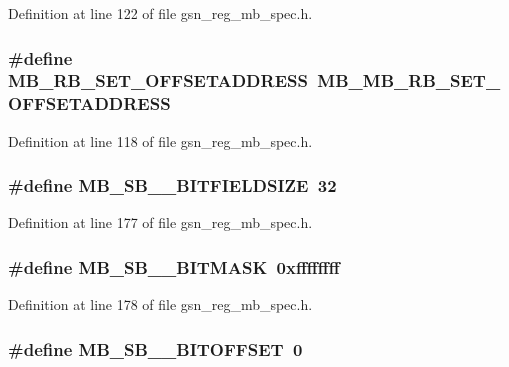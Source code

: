 Definition at line 122 of file gsn\_\-reg\_\-mb\_\-spec.h.

\hypertarget{a00562_abe72a2bd73f8a64e98523a119f226856}{
\subsubsection[{MB\_\-RB\_\-SET\_\-OFFSETADDRESS}]{\setlength{\rightskip}{0pt plus 5cm}\#define MB\_\-RB\_\-SET\_\-OFFSETADDRESS~MB\_\-MB\_\-RB\_\-SET\_\-OFFSETADDRESS}}
\label{a00562_abe72a2bd73f8a64e98523a119f226856}


Definition at line 118 of file gsn\_\-reg\_\-mb\_\-spec.h.

\hypertarget{a00562_aaec7d6f877389ed3b70fb6ee5a07a5e5}{
\subsubsection[{MB\_\-SB\_\-0\_\-BITFIELDSIZE}]{\setlength{\rightskip}{0pt plus 5cm}\#define MB\_\-SB\_\_\-BITFIELDSIZE~32}}
\label{a00562_aaec7d6f877389ed3b70fb6ee5a07a5e5}


Definition at line 177 of file gsn\_\-reg\_\-mb\_\-spec.h.

\hypertarget{a00562_a5dc722f16108621d17c15ad979f571aa}{
\subsubsection[{MB\_\-SB\_\-0\_\-BITMASK}]{\setlength{\rightskip}{0pt plus 5cm}\#define MB\_\-SB\_\_\-BITMASK~0xffffffff}}
\label{a00562_a5dc722f16108621d17c15ad979f571aa}


Definition at line 178 of file gsn\_\-reg\_\-mb\_\-spec.h.

\hypertarget{a00562_ac22daccb809dff71c03e85636a9a5054}{
\subsubsection[{MB\_\-SB\_\-0\_\-BITOFFSET}]{\setlength{\rightskip}{0pt plus 5cm}\#define MB\_\-SB\_\_\-BITOFFSET~0}}
\label{a00562_ac22daccb809dff71c03e85636a9a5054}


